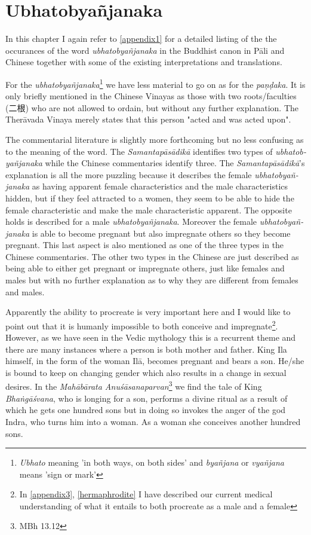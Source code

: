 \section{Ubhatob­yañ­janaka}

In this chapter I again refer to \ref{appendix1} for a detailed listing of the the occurances of the word {\em ubhatob­yañ­janaka} in the Buddhist canon in Pāli and Chinese together with some of the existing interpretations and translations.

For the {\em ubhatob­yañ­janaka}\footnote{{\em Ubhato} meaning 'in both ways, on both sides' and {\em byañjana} or {\em vyañjana} means 'sign or mark'} we have less material to go on as for the {\em paṇḍaka}. It is only briefly mentioned in the Chinese Vinayas as those with two roots/faculties (二根) who are not allowed to ordain, but without any further explanation. The Therāvada Vinaya merely states that this person "acted and was acted upon". 

The commentarial literature is slightly more forthcoming but no less confusing as to the meaning of the word. The {\em Samantapāsādikā} identifies two types of {\em ubhatob­yañ­janaka} while the Chinese commentaries identify three. The {\em Samantapāsādikā}'s explanation is all the more puzzling because it describes the female {\em ubhatob­yañ­janaka} as having apparent female characteristics and the male characteristics hidden, but if they feel attracted to a women, they seem to be able to hide the female characteristic and make the male characteristic apparent. The opposite holds is described for a male {\em ubhatob­yañ­janaka}. Moreover the female {\em ubhatob­yañ­janaka} is able to become pregnant but also impregnate others so they become pregnant. This last aspect is also mentioned as one of the three types in the Chinese commentaries. The other two types in the Chinese are just described as being able to either get pregnant or impregnate others, just like females and males but with no further explanation as to why they are different from females and males. 

Apparently the ability to procreate is very important here and I would like to point out that it is humanly impossible to both conceive and impregnate\footnote{In \ref{appendix3}, \ref{hermaphrodite} I have described our current medical understanding of what it entails to both procreate as a male and a female}. However, as we have seen in the Vedic mythology this is a recurrent theme and there are many instances where a person is both mother and father. King Ila himself, in the form of the woman Ilā, becomes pregnant and bears a son. He/she is bound to keep on changing gender which also results in a change in sexual desires. In the {\em Mahābārata Anuśāsanaparvan}\footnote{MBh 13.12} we find the tale of King {\em Bhaṅgāśvana}, who is longing for a son, performs a divine ritual as a result of which he gets one hundred sons but in doing so invokes the anger of the god Indra, who turns him into a woman. As a woman she conceives another hundred sons.

